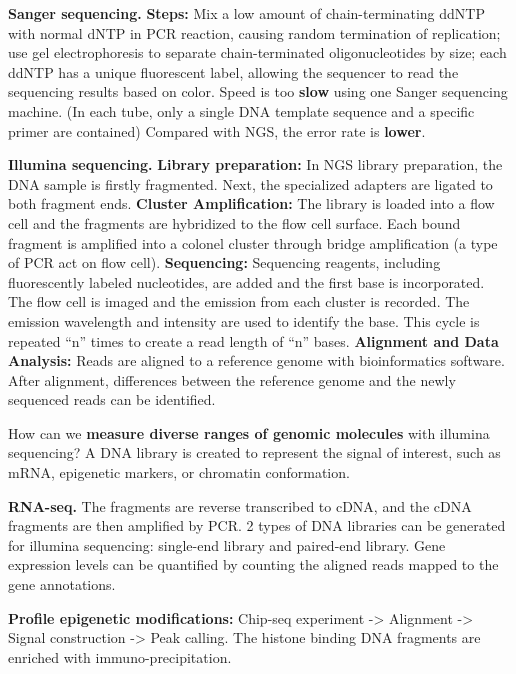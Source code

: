 \vspace{0.1em}\noindent
\textbf{Sanger sequencing.} \textbf{Steps:} Mix a low amount of chain-terminating ddNTP with normal dNTP in PCR reaction, causing random termination of replication; use gel electrophoresis to separate chain-terminated oligonucleotides by size; each ddNTP has a unique fluorescent label, allowing the sequencer to read the sequencing results based on color. Speed is too \textbf{slow} using one Sanger sequencing machine. (In each tube, only a single DNA template sequence and a specific primer are contained) Compared with NGS, the error rate is \textbf{lower}.

\vspace{0.1em}\noindent
\textbf{Illumina sequencing.} \textbf{Library preparation:} In NGS library preparation, the DNA sample is firstly fragmented. Next, the specialized adapters are ligated to both fragment ends. \textbf{Cluster Amplification:} The library is loaded into a flow cell and the fragments are hybridized to the flow cell surface. Each bound fragment is amplified into a colonel cluster through bridge amplification (a type of PCR act on flow cell). \textbf{Sequencing:} Sequencing reagents, including fluorescently labeled nucleotides, are added and the first base is incorporated. The flow cell is imaged and the emission from each cluster is recorded. The emission wavelength and intensity are used to identify the base. This cycle is repeated “n” times to create a read length of “n” bases. \textbf{Alignment and Data Analysis:} Reads are aligned to a reference genome with bioinformatics software. After alignment, differences between the reference genome and the newly sequenced reads can be identified.

\vspace{0.1em}\noindent
How can we \textbf{measure diverse ranges of genomic molecules} with illumina sequencing? A DNA library is created to represent the signal of interest, such as mRNA, epigenetic markers, or chromatin conformation.

\vspace{0.1em}\noindent
\textbf{RNA-seq.} The fragments are reverse transcribed to cDNA, and the cDNA fragments are then amplified by PCR. 2 types of DNA libraries can be generated for illumina sequencing: single-end library and paired-end library. Gene expression levels can be quantified by counting the aligned reads mapped to the gene annotations. 

\vspace{0.1em}\noindent
\textbf{Profile epigenetic modifications:} Chip-seq experiment -> Alignment -> Signal construction -> Peak calling. The histone binding DNA fragments are enriched with immuno-precipitation.

